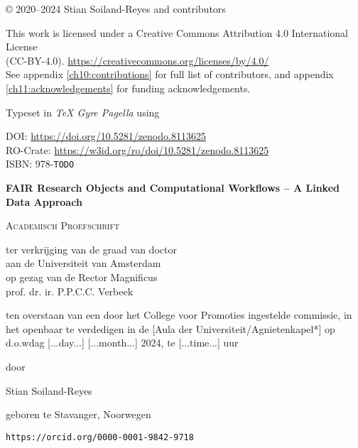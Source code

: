\newpage

\vspace*{\fill}

© 2020--2024 Stian Soiland-Reyes and contributors

This work is licensed under a Creative Commons Attribution 4.0 International License \\
(CC-BY-4.0). \url{https://creativecommons.org/licenses/by/4.0/}\\
See appendix \ref{ch10:contributions} for full list of contributors, and appendix \ref{ch11:acknowledgements} for funding acknowledgements.


Typeset in \emph{TeX Gyre Pagella} using \mybanner

DOI: \url{https://doi.org/10.5281/zenodo.8113625}\\
RO-Crate: \url{https://w3id.org/ro/doi/10.5281/zenodo.8113625}\\
ISBN: 978-\texttt{TODO}

\newpage

\begin{center}

    
\Huge
\textbf{FAIR Research Objects and Computational Workflows – A Linked Data Approach}
     
\vspace*{\fill}

\LARGE
\textsc{Academisch Proefschrift}

\vspace*{\fill}

\large
{ \itshape

ter verkrijging van de graad van doctor\\
aan de Universiteit van Amsterdam\\
op gezag van de Rector Magnificus\\
prof. dr. ir. P.P.C.C. Verbeek

ten overstaan van een door het College voor Promoties ingestelde commissie,
in het openbaar te verdedigen in de [Aula der Universiteit/Agnietenkapel*]
op d.o.wdag [...day...] [...month...] 2024, te [...time...] uur

door 
}

\vspace*{\fill}

\LARGE
Stian Soiland-Reyes

\large
geboren te Stavanger, Noorwegen 

\texttt{https://orcid.org/0000-0001-9842-9718} 
\end{center}

